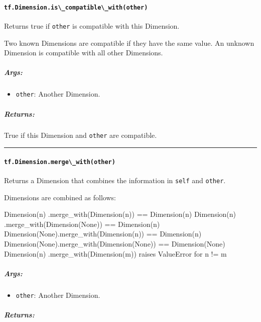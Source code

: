 \paragraph{\texorpdfstring{\lstinline{tf.Dimension.is\_compatible\_with(other)}
}{tf.Dimension.is\_compatible\_with(other) }}\label{tf.dimension.isux5fcompatibleux5fwithother}

Returns true if \lstinline{other} is compatible with this Dimension.

Two known Dimensions are compatible if they have the same value. An
unknown Dimension is compatible with all other Dimensions.

\subparagraph{Args: }\label{args-41}

\begin{itemize}
\tightlist
\item
  \lstinline{other}: Another Dimension.
\end{itemize}

\subparagraph{Returns: }\label{returns-37}

True if this Dimension and \lstinline{other} are compatible.

\begin{center}\rule{0.5\linewidth}{\linethickness}\end{center}

\paragraph{\texorpdfstring{\lstinline{tf.Dimension.merge\_with(other)}
}{tf.Dimension.merge\_with(other) }}\label{tf.dimension.mergeux5fwithother}

Returns a Dimension that combines the information in \lstinline{self} and
\lstinline{other}.

Dimensions are combined as follows:

Dimension(n) .merge\_with(Dimension(n)) == Dimension(n) Dimension(n)
.merge\_with(Dimension(None)) == Dimension(n)
Dimension(None).merge\_with(Dimension(n)) == Dimension(n)
Dimension(None).merge\_with(Dimension(None)) == Dimension(None)
Dimension(n) .merge\_with(Dimension(m)) raises ValueError for n != m

\subparagraph{Args: }\label{args-42}

\begin{itemize}
\tightlist
\item
  \lstinline{other}: Another Dimension.
\end{itemize}

\subparagraph{Returns: }\label{returns-38}

